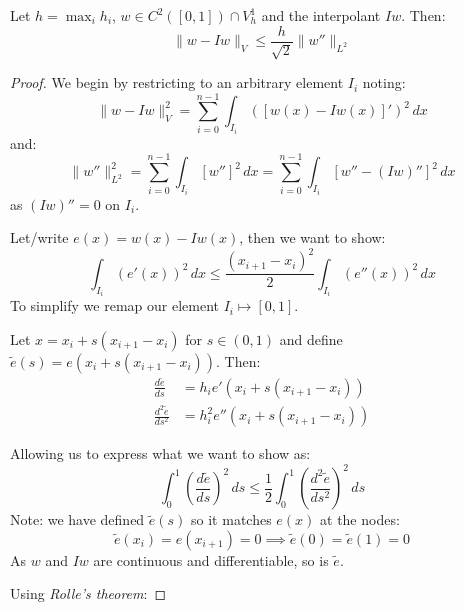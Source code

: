 \begin{theorem}{}{}
    Let $h = \max_i h_i$, $w \in C^2([0, 1]) \cap V_h^1$ and the interpolant $I w$. Then:
    \[
        \|w - Iw\|_V \leq \frac{h}{\sqrt{2}} \|w''\|_{L^2}
    \]

\end{theorem}
\begin{proof}
    We begin by restricting to an arbitrary element $I_i$ noting:
    \[
        \|w - I w\|_V^2 = \sum_{i=0}^{n-1} \int_{I_i} (\left[w(x) - I w(x)\right]')^2 \, dx
    \]
    and:
    \[
        \|w''\|_{L^2}^2 = \sum_{i=0}^{n-1} \int_{I_i} \left[w''\right]^2 \, dx = \sum_{i=0}^{n-1} \int_{I_i} \left[w'' - (I w)''\right]^2 \, dx
    \]
    as $(I w)'' = 0$ on $I_i$.

    Let/write $e(x) = w(x) - I w(x)$, then we want to show:
    \[
        \int_{I_i} (e'(x))^2 \, dx \leq \frac{(x_{i+1} - x_i)^2}{2} \int_{I_i} (e''(x))^2 \, dx
    \]
    To simplify we remap our element $I_i \mapsto [0, 1]$.

    Let $x = x_i + s(x_{i+1} - x_i)$ for $s \in (0, 1)$ and define $\tilde{e}(s) = e(x_i + s(x_{i+1} - x_i))$.
    Then:
    \begin{align*}
        \frac{d\tilde{e}}{ds}     & = h_i e'(x_i + s (x_{i+1} - x_i) )    \\
        \frac{d^2\tilde{e}}{ds^2} & = h_i^2 e''(x_i + s (x_{i+1} - x_i) )
    \end{align*}

    Allowing us to express what we want to show as:
    \[
        \int_0^1 \left(\frac{d\tilde{e}}{ds}\right)^2 \, ds \leq \frac{1}{2} \int_0^1 \left(\frac{d^2\tilde{e}}{ds^2}\right)^2 \, ds
    \]
    Note: we have defined $\tilde{e}(s)$ so it matches $e(x)$ at the nodes:
    \[
        \tilde{e}(x_i) = e(x_{i + 1}) = 0 \implies \tilde{e}(0) = \tilde{e}(1) = 0
    \]
    As $w$ and $I w$ are continuous and differentiable, so is $\tilde{e}$.

    Using \emph{Rolle's theorem}:


\end{proof}
